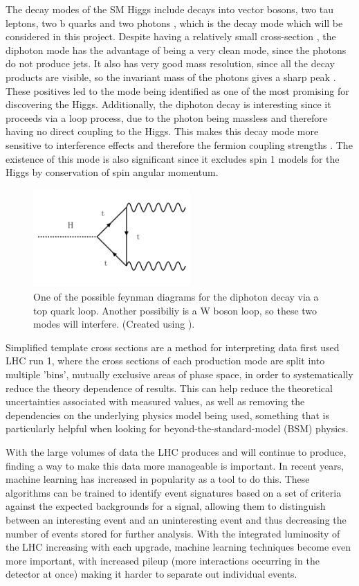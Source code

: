 \documentclass[12pt]{article}
\begin{document}
The decay modes of the SM Higgs include decays into vector bosons, two tau leptons, two b quarks and two photons \cite{gluinotheory1}, which is the decay mode which will be considered in this project. Despite having a relatively small cross-section \cite{cmsannouncement}, the diphoton mode has the advantage of being a very clean mode, since the photons do not produce jets. It also has very good mass resolution, since all the decay products are visible, so the invariant mass of the photons gives a sharp peak \cite{seezdiphoton}. These positives led to the mode being identified as one of the most promising for discovering the Higgs. Additionally, the diphoton decay is interesting since it proceeds via a loop process, due to the photon being massless and therefore having no direct coupling to the Higgs. This makes this decay mode more sensitive to interference effects and therefore the fermion coupling strengths \cite{cmsanalysis1}.  The existence of this mode is also significant since it excludes spin 1 models for the Higgs by conservation of spin angular momentum. 

\begin{figure}[H]
\centering
\includegraphics[width=6cm]{decay.png}
\caption{One of the possible feynman diagrams for the diphoton decay via a top quark loop. Another possibiliy is a W boson loop, so these two modes will interfere. (Created using \cite{feynmanmaker}).}
	\label{decay}
\end{figure}




Simplified template cross sections are a method for interpreting data first used LHC run 1, where the cross sections of each production mode are split into multiple 'bins', mutually exclusive areas of phase space, in order to systematically reduce the theory dependence of results. This can help reduce the theoretical uncertainties associated with measured values, as well as removing the dependencies on the underlying physics model being used, something that is particularly helpful when looking for beyond-the-standard-model (BSM) physics. 

With the large volumes of data the LHC produces and will continue to produce, finding a way to make this data more manageable is important. In recent years, machine learning has increased in popularity as a tool to do this. These algorithms can be trained to identify event signatures based on a set of criteria against the expected backgrounds for a signal, allowing them to distinguish between an interesting event and an uninteresting event and thus decreasing the number of events stored for further analysis. With the integrated luminosity of the LHC increasing with each upgrade, machine learning techniques become even more important, with increased pileup (more interactions occurring in the detector at once) making it harder to separate out individual events. 
\end{document}
